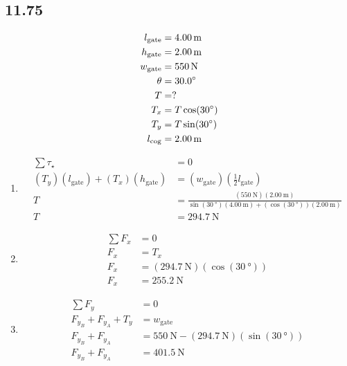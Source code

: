 \documentclass{article}
\begin{document}
\subsection{11.75}
\begin{align*}
	l_\text{gate} & = \SI{4.00}{\meter} \\
	h_\text{gate} & = \SI{2.00}{\meter} \\
	w_\text{gate} & = \SI{550}{\newton} \\
	\theta & = \SI{30.0}{\degree} \\
	T & = ? \\
	T_x & = T\cos(30\degree) \\
	T_y & = T\sin(30\degree) \\
	l_\text{cog} & = \SI{2.00}{\meter}
\end{align*}
\begin{enumerate}[label=\textbf{(\alph*)}]
	\item
		\begin{align*}
			\sum \tau_\star & = 0 \\
			(T_y)(l_\text{gate}) + (T_x)(h_\text{gate}) & = (w_\text{gate})\left(\frac{1}{2}l_\text{gate}\right) \\
			T & = \frac{(\SI{550}{\newton})(\SI{2.00}{\meter})}{\sin(\SI{30}{\degree})(\SI{4.00}{\meter}) + (\cos(\SI{30}{\degree}))(\SI{2.00}{\meter})} \\
			T & = \SI{294.7}{\newton}
		\end{align*}
	\item
		\begin{align*}
			\sum F_x & = 0 \\
			F_x & = T_x \\
			F_x & = (\SI{294.7}{\newton})(\cos(\SI{30}{\degree})) \\
			F_x & = \SI{255.2}{\newton}
		\end{align*}
	\item
		\begin{align*}
			\sum F_y & = 0 \\
			F_{y_B} + F_{y_A} + T_y & = w_\text{gate} \\
			F_{y_B} + F_{y_A} & = \SI{550}{\newton} - (\SI{294.7}{\newton})(\sin(\SI{30}{\degree})) \\
			F_{y_B} + F_{y_A} & = \SI{401.5}{\newton}
		\end{align*}
\end{enumerate}
\end{document}
